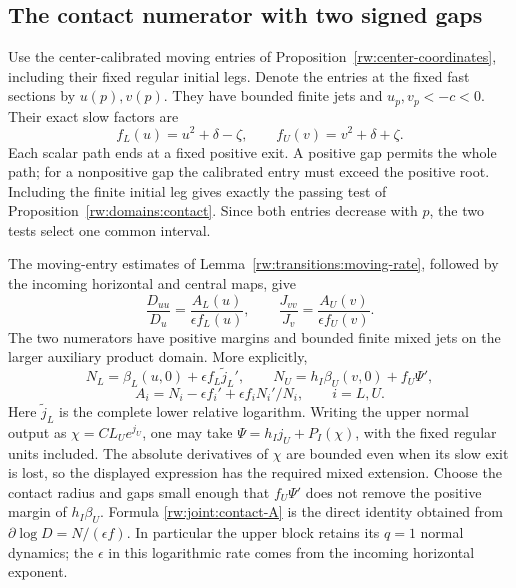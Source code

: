 \subsection{The contact numerator with two signed gaps}

Use the center-calibrated moving entries of
Proposition~\ref{rw:center-coordinates}, including their fixed
regular initial legs. Denote the entries at the fixed fast sections
by $u(p),v(p)$. They have bounded finite jets and
$u_p,v_p<-c<0$. Their exact slow factors are
\[
 f_L(u)=u^2+\delta-\zeta,\qquad
 f_U(v)=v^2+\delta+\zeta.
\]
Each scalar path ends at a fixed positive exit. A positive gap permits
the whole path; for a nonpositive gap the calibrated entry must exceed
the positive root. Including the finite initial leg gives exactly the
passing test of Proposition~\ref{rw:domains:contact}. Since both entries
decrease with $p$, the two tests select one common interval.

The moving-entry estimates of
Lemma~\ref{rw:transitions:moving-rate}, followed by the incoming
horizontal and central maps, give
\begin{equation}\label{rw:joint:contact-rates}
 \frac{D_{uu}}{D_u}=\frac{A_L(u)}{\epsilon f_L(u)},\qquad
 \frac{J_{vv}}{J_v}=\frac{A_U(v)}{\epsilon f_U(v)}.
\end{equation}
The two numerators have positive margins and bounded finite mixed
jets on the larger auxiliary product domain. More explicitly,
\[
 N_L=\beta_L(u,0)+\epsilon f_L\widetilde j_L',\qquad
 N_U=h_I\beta_U(v,0)+f_U\Psi',
\]
\begin{equation}\label{rw:joint:contact-A}
 A_i=N_i-\epsilon f_i'
                  +\epsilon f_iN_i'/N_i,\qquad i=L,U.
\end{equation}
Here $\widetilde j_L$ is the complete lower relative logarithm.
Writing the upper normal output as
$\chi=C L_Ue^{j_U}$, one may take
$\Psi=h_Ij_U+P_I(\chi)$, with the fixed regular units
included. The absolute derivatives of $\chi$ are bounded even
when its slow exit is lost, so the displayed expression has the
required mixed extension. Choose the contact radius and gaps small
enough that $f_U\Psi'$ does not remove the positive margin of
$h_I\beta_U$. Formula \eqref{rw:joint:contact-A} is the direct
identity obtained from $\partial\log D=N/(\epsilon f)$.
In particular the upper block retains its $q=1$ normal dynamics;
the $\epsilon$ in this logarithmic rate comes from the incoming
horizontal exponent.

